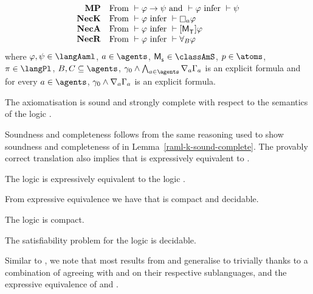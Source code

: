 \begin{definition}
$$\begin{array}{rl}
    {\bf MP}    & \text{From } \proves \phi \implies \psi \text{ and } \proves \phi \text{ infer } \proves \psi\\
    {\bf NecK}  & \text{From } \proves \phi \text{ infer } \proves \necessaryA \phi\\
    {\bf NecA} & \text{From } \proves \phi \text{ infer } \proves \actionA{\aPModel{\aStatesT}} \phi\\
    {\bf NecR} & \text{From } \proves \phi \text{ infer } \proves \allrefsBs \phi
\end{array}
$$
where $\phi, \psi \in \langAaml$, $\agentA \in \agents$, $\aPModel{\aStateS} \in \classAmS$, $\atomP \in \atoms$, $\pi \in \langPl$, $\agentsB, \agentsC \subseteq \agents$, $\gamma_0 \land \bigwedge_{\agentA \in \agents} \coversA \Gamma_\agentA$ is an explicit formula and for every $\agentA \in \agents$, $\gamma_0 \land \nabla_{a} \Gamma_a$ is an explicit formula.
\end{definition}

\begin{lemma}\label{raml-s5-sound-complete}
The axiomatisation \axiomRamlS{} is sound and strongly complete with respect to the semantics of the logic \logicRamlS{}.
\end{lemma}

Soundness and completeness follows from the same reasoning used to show soundness and completeness of \axiomRamlK{} in Lemma~\ref{raml-k-sound-complete}.
The provably correct translation also implies that \logicRamlS{} is expressively equivalent to \logicS{}.

\begin{corollary}\label{raml-s5-expressive-equivalence}
The logic \logicRamlS{} is expressively equivalent to the logic \logicS{}.
\end{corollary}

From expressive equivalence we have that \logicRmlS{} is compact and decidable.

\begin{corollary}
The logic \logicRamlS{} is compact.
\end{corollary}

\begin{corollary}
The satisfiability problem for the logic \logicRamlS{} is decidable.
\end{corollary}

Similar to \logicRamlK{}, we note that most results from \logicAmlS{} and \logicRmlS{} generalise to \logicRamlS{} trivially thanks to a combination of \logicRamlS{} agreeing with \logicAmlS{} and \logicRmlS{} on their respective sublanguages, and the expressive equivalence of \logicRamlS{} and \logicS{}.

